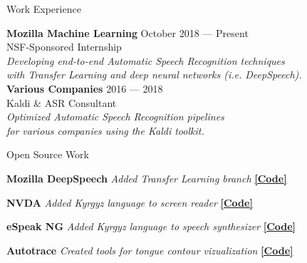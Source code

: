 \documentclass{resume} %
\begin{document}
\begin{rSection}{Work Experience}
  
{\bf Mozilla Machine Learning} \hfill {October 2018 --- Present} \\ 
NSF-Sponsored Internship \hfill {} \\
\textit{Developing end-to-end Automatic Speech Recognition techniques} \hfill {} \\
\textit{with Transfer Learning and deep neural networks (i.e. DeepSpeech).} \hfill {} \\
  
{\bf Various Companies} \hfill {2016 --- 2018} \\ 
Kaldi \& ASR Consultant  \hfill {} \\
\textit{Optimized Automatic Speech Recognition pipelines}   \hfill {} \\
\textit{for various companies using the Kaldi toolkit.}   \hfill {} \\
\end{rSection}



\begin{rSection}{Open Source Work}

  {\textbf{Mozilla DeepSpeech}} {\hfill \textit{Added Transfer Learning branch} {\hspace{2.5cm} \href{https://github.com/mozilla/DeepSpeech/tree/transfer-learning}{\textbf{[Code]}}}} \\
\vspace{-.35cm}

{\textbf{NVDA}} {\hfill \textit{Added Kyrgyz language to screen reader} {\hspace{2.5cm} \href{https://github.com/JRMeyer/nvda}{\textbf{[Code]}}}} \\
\vspace{-.35cm}

{\textbf{eSpeak NG}} {\hfill \textit{Added Kyrgyz language to speech synthesizer} {\hspace{2.5cm} \href{https://github.com/rhdunn/espeak/commits?author=JRMeyer}{\textbf{[Code]}}}}\\
\vspace{-.35cm}

{\textbf{Autotrace}} {\hfill \textit{Created tools for tongue contour vizualization} {\hspace{2.5cm} \href{https://github.com/JRMeyer/Autotrace}{\textbf{[Code]}}}} \\

\end{rSection}
\end{document}
